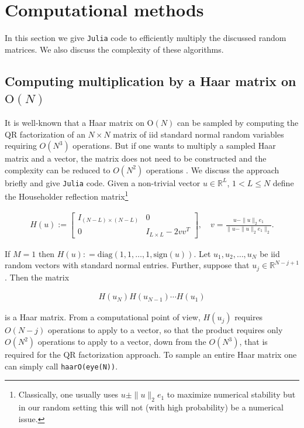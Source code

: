 \section{Computational methods}

In this section we give {\tt Julia} code to efficiently multiply the discussed random matrices.  We also discuss the complexity of these algorithms.

\subsection{Computing multiplication by a Haar matrix on $\mathrm{O}(N)$}\label{s:haar}

It is well-known that a Haar matrix on $\mathrm{O}(N)$ can be sampled by computing the QR factorization of an $N \times N$ matrix of iid standard normal random variables requiring $O(N^3)$ operations.  But if one wants to multiply a sampled Haar matrix and a vector, the matrix does not need to be constructed and the complexity can be reduced to $O(N^2)$ operations \cite{Stewart1980}.  We discuss the approach briefly and give {\tt Julia} code.  Given a non-trivial vector $u \in \mathbb R^L$, $1 < L \leq N$ define the Householder reflection matrix\footnote{Classically, one usually uses $u \pm \|u\|_2 e_1$ to maximize numerical stability but in our random setting this will not (with high probability) be a numerical issue.}

\begin{align}
  H(u) := \begin{bmatrix} I_{(N-L)\times (N-L)} & 0 \\ 0 & I_{L\times L} - 2 vv^T \end{bmatrix}, \quad v = \frac{u - \|u\|_2 e_1}{\|u - \|u\|_2 e_1\|_2}.
\end{align}

If $M =1$ then $H(u) : = \mathrm{diag}(1,1,\ldots,1,\mathrm{sign}(u))$.  Let $u_1,u_2,\ldots,u_{N}$ be iid random vectors with standard normal entries.  Further, suppose that $u_j \in \mathbb R^{N-j+1}$.  Then the matrix

\begin{align}
  H(u_N) H(u_{N-1}) \cdots H(u_1)
\end{align}

is a Haar matrix. From a computational point of view, $H(u_j)$ requires $O(N-j)$ operations to apply to a vector, so that the product requires only $O(N^2)$ operations to apply to a vector, down from the $O(N^3)$, that is required for the QR factorization approach.  To sample an entire Haar matrix one can simply call {\tt haarO(eye(N))}.

